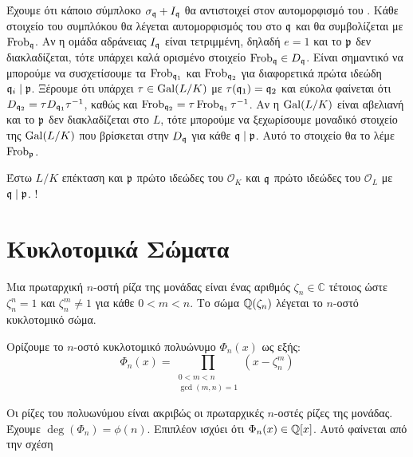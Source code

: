 \documentclass{report}
\begin{document}
Έχουμε ότι κάποιο σύμπλοκο $\sigma_{\mathfrak{q}} + I_{\mathfrak{q}}$ θα αντιστοιχεί στον αυτομορφισμό του . Κάθε στοιχείο του συμπλόκου θα λέγεται αυτομορφισμός του  στο $\mathfrak{q}$ και θα συμβολίζεται με $\operatorname{Frob}_{\mathfrak{q}}$. Αν η ομάδα αδράνειας $I_{\mathfrak{q}}$ είναι τετριμμένη, δηλαδή $e=1$ και το $\mathfrak{p}$ δεν διακλαδίζεται, τότε υπάρχει καλά ορισμένο στοιχείο $\operatorname{Frob}_{\mathfrak{q}} \in D_{\mathfrak{q}}$. Είναι σημαντικό να μπορούμε να συσχετίσουμε τα $\operatorname{Frob}_{\mathfrak{q}_1}$ και $\operatorname{Frob}_{\mathfrak{q}_2}$ για διαφορετικά πρώτα ιδεώδη $\mathfrak{q}_i \mid \mathfrak{p}$. Ξέρουμε ότι υπάρχει $\tau \in \operatorname{Gal}(L/K)$ με $\tau(\mathfrak{q}_1) = \mathfrak{q}_2$ και εύκολα φαίνεται ότι $D_{\mathfrak{q}_2} = \tau D_{\mathfrak{q}_1} \tau^{-1}$, καθώς και $\operatorname{Frob}_{\mathfrak{q}_2} = \tau \operatorname{Frob}_{\mathfrak{q}_1} \tau^{-1}$. Αν η $\operatorname{Gal}(L/K)$ είναι αβελιανή και το $\mathfrak{p}$ δεν διακλαδίζεται στο $L$, τότε μπορούμε να ξεχωρίσουμε μοναδικό στοιχείο της $\operatorname{Gal}(L/K)$ που βρίσκεται στην $D_{\mathfrak{q}}$ για κάθε $\mathfrak{q} \mid \mathfrak{p}$. Αυτό το στοιχείο θα το λέμε $\operatorname{Frob}_{\mathfrak{p}}$.



\begin{prop}
	Έστω $L/K$ επέκταση  και $\mathfrak{p}$ πρώτο ιδεώδες του $\mathcal{O}_K$ και $\mathfrak{q}$ πρώτο ιδεώδες του $\mathcal{O}_L$ με $\mathfrak{q} \mid \mathfrak{p}$. !
\end{prop}



\section{Κυκλοτομικά Σώματα}


\begin{defn}Μια πρωταρχική $n$-οστή ρίζα της μονάδας είναι ένας αριθμός $\zeta_n \in \mathbb{C}$ τέτοιος ώστε $\zeta_n^n = 1$ και $\zeta_n^m \neq 1$ για κάθε $0<m<n$. Το σώμα $\mathbb{Q}(\zeta_n)$ λέγεται το $n$-οστό κυκλοτομικό σώμα. 
\end{defn}
Ορίζουμε το $n$-οστό κυκλοτομικό πολυώνυμο $\Phi_n(x)$ ως εξής:
$$\Phi_n(x) = \prod\limits_{\substack{ 0 < m < n \\ \gcd(m,n)=1}} (x - \zeta_n^m)$$

Οι ρίζες του πολυωνύμου είναι ακριβώς οι πρωταρχικές $n$-οστές ρίζες της μονάδας. Έχουμε $\deg (\Phi_n) = \phi(n)$. Επιπλέον ισχύει ότι $\Phi_n(x) \in \mathbb{Q}[x]$. Αυτό φαίνεται από την σχέση
\end{document}
